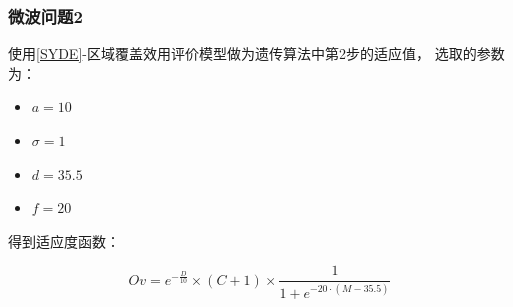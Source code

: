\documentclass[UTF8,12pt]{ctexart}
\begin{document}
        \subsubsection{微波问题2}
        使用\ref{SYDE}-区域覆盖效用评价模型做为遗传算法中第2步的适应值，
        选取的参数为：
        \begin{itemize}
            \item $a=10$
            \item $σ = 1$
            \item $d=35.5$
            \item $f=20$
        \end{itemize}

        得到适应度函数：
        \begin{Large}
            $$Ov = e^{-\frac {D}{10}}×(C+1)×\frac {1}{1+e^{-20·(M-35.5)}}$$
        \end{Large}
\end{document}
